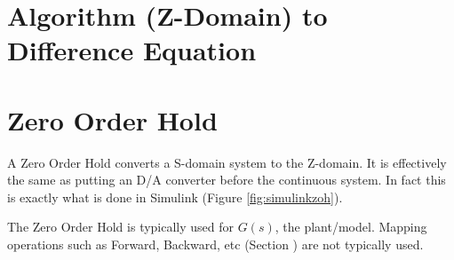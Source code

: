 \documentclass{article}
\newcommand{\sincludepdf}[2][]{
	
}
\begin{document}
\section{Algorithm (Z-Domain) to Difference Equation}

\sincludepdf[pages={11},
			pagecommand=\subsection*{Example 1}
		]{scan/11211301.pdf}

\sincludepdf[pages={12},
			pagecommand=\subsection*{Example 2}
		]{scan/11211301.pdf}

\sincludepdf[pages={13},
			pagecommand=\subsection*{Example 3}
		]{scan/11211301.pdf}

\clearpage
\section{Zero Order Hold}
\label{sec:zoh}

A Zero Order Hold converts a S-domain system to the Z-domain.
It is effectively the same as putting an D/A converter before
the continuous system.
In fact this is exactly what is done in Simulink (Figure \ref{fig:simulinkzoh}).

The Zero Order Hold is typically used for $G(s)$, the plant/model.
Mapping operations such as Forward, Backward, etc
(Section \label{sec:mapping}) are not typically used.
\end{document}
